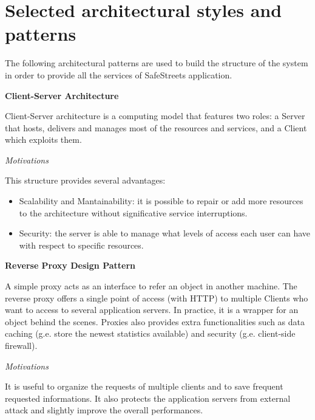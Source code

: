 \documentclass{report}
\begin{document}
\clearpage

\section{Selected architectural	styles and patterns}
The following architectural patterns are used to build the structure of the system in order to provide all the services of SafeStreets application.\\

\begin{center}\large{\textbf{Client-Server Architecture}}\end{center}
Client-Server architecture is a computing model that features two roles: a Server that hosts, delivers and manages most of the resources and services, and a Client which exploits them.
\begin{center}\large{\textit{Motivations}}\end{center}
\noindent This structure provides several advantages:
\begin{itemize}
    \item Scalability and Mantainability: it is possible to repair or add more resources to the architecture without significative service interruptions.
    \item Security: the server is able to manage what levels of access each user can have with respect to specific resources.
\end{itemize}

\vspace{2mm}
\begin{center}\large{\textbf{Reverse Proxy Design Pattern}}\end{center}
    A simple proxy acts as an interface to refer an object in another machine. The reverse proxy offers a single point of access (with HTTP) to multiple Clients who want to access to several application servers. In practice, it is a wrapper for an object behind the scenes. 
    Proxies also provides extra functionalities such as data caching (g.e. store the newest statistics available) and security (g.e. client-side firewall).
    \begin{center}\large{\textit{Motivations}}\end{center} 
    It is useful to organize the requests of multiple clients and to save frequent requested informations. It also protects the application servers from external attack and slightly improve the overall performances.
    
\end{document}
